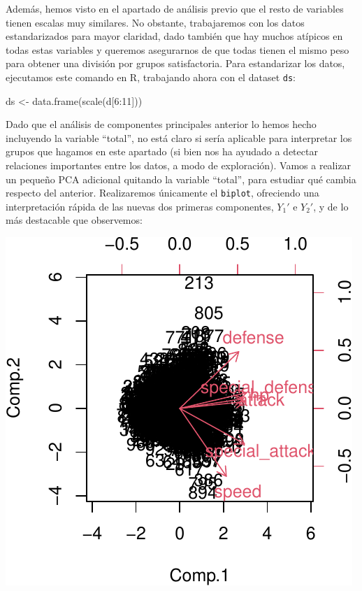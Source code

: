 \documentclass[
  12pt,
]{extreport}
\newenvironment{Shaded}{\begin{snugshade}}{\end{snugshade}}
\newcommand{\DecValTok}[1]{\textcolor[rgb]{0.68,0.00,0.00}{#1}}
\newcommand{\FunctionTok}[1]{\textcolor[rgb]{0.28,0.35,0.67}{#1}}
\newcommand{\NormalTok}[1]{\textcolor[rgb]{0.00,0.23,0.31}{#1}}
\newcommand{\OtherTok}[1]{\textcolor[rgb]{0.00,0.23,0.31}{#1}}
\newcommand{\SpecialCharTok}[1]{\textcolor[rgb]{0.37,0.37,0.37}{#1}}
\begin{document}
Además, hemos visto en el apartado de análisis previo que el resto de
variables tienen escalas muy similares. No obstante, trabajaremos con
los datos estandarizados para mayor claridad, dado también que hay
muchos atípicos en todas estas variables y queremos asegurarnos de que
todas tienen el mismo peso para obtener una división por grupos
satisfactoria. Para estandarizar los datos, ejecutamos este comando en
R, trabajando ahora con el dataset \texttt{ds}:

\begin{Shaded}
\begin{Highlighting}[]
\NormalTok{ds }\OtherTok{\textless{}{-}} \FunctionTok{data.frame}\NormalTok{(}\FunctionTok{scale}\NormalTok{(d[}\DecValTok{6}\SpecialCharTok{:}\DecValTok{11}\NormalTok{]))}
\end{Highlighting}
\end{Shaded}

Dado que el análisis de componentes principales anterior lo hemos hecho
incluyendo la variable ``total'', no está claro si sería aplicable para
interpretar los grupos que hagamos en este apartado (si bien nos ha
ayudado a detectar relaciones importantes entre los datos, a modo de
exploración). Vamos a realizar un pequeño PCA adicional quitando la
variable ``total'', para estudiar qué cambia respecto del anterior.
Realizaremos únicamente el \texttt{biplot}, ofreciendo una
interpretación rápida de las nuevas dos primeras componentes, \(Y_1'\) e
\(Y_2'\), y de lo más destacable que observemos:

\begin{center}
\includegraphics{trabajo_files/figure-pdf/unnamed-chunk-40-1.pdf}
\end{center}
\end{document}
